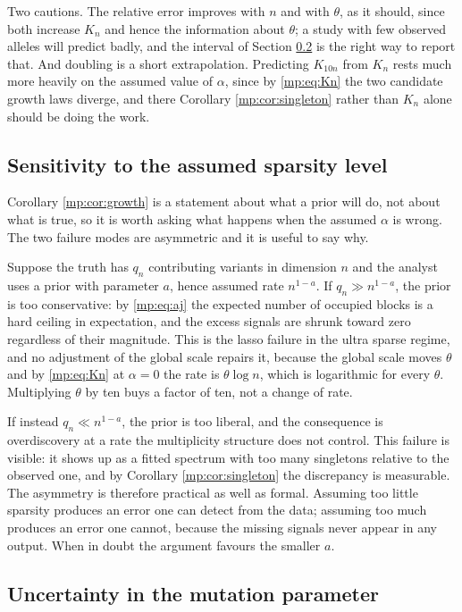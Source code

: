 Two cautions. The relative error improves with $n$ and with $\theta$, as it should, since
both increase $K_n$ and hence the information about $\theta$; a study with few observed
alleles will predict badly, and the interval of Section \ref{mp:sec:numD} is the right way to
report that. And doubling is a short extrapolation. Predicting $K_{10n}$ from $K_n$ rests
much more heavily on the assumed value of $\alpha$, since by \eqref{mp:eq:Kn} the two candidate
growth laws diverge, and there Corollary \ref{mp:cor:singleton} rather than $K_n$ alone should
be doing the work.

\subsection{Sensitivity to the assumed sparsity level}
\label{mp:sec:sens}

Corollary \ref{mp:cor:growth} is a statement about what a prior will do, not about what is true,
so it is worth asking what happens when the assumed $\alpha$ is wrong. The two failure modes
are asymmetric and it is useful to say why.

Suppose the truth has $q_n$ contributing variants in dimension $n$ and the analyst uses a
prior with parameter $a$, hence assumed rate $n^{1-a}$. If $q_n\gg n^{1-a}$, the prior is too
conservative: by \eqref{mp:eq:aj} the expected number of occupied blocks is a hard ceiling in
expectation, and the excess signals are shrunk toward zero regardless of their magnitude.
This is the lasso failure in the ultra sparse regime, and no adjustment of the global scale
repairs it, because the global scale moves $\theta$ and by \eqref{mp:eq:Kn} at $\alpha=0$ the
rate is $\theta\log n$, which is logarithmic for every $\theta$. Multiplying $\theta$ by ten
buys a factor of ten, not a change of rate.

If instead $q_n\ll n^{1-a}$, the prior is too liberal, and the consequence is overdiscovery
at a rate the multiplicity structure does not control. This failure is visible: it shows up
as a fitted spectrum with too many singletons relative to the observed one, and by Corollary
\ref{mp:cor:singleton} the discrepancy is measurable. The asymmetry is therefore practical as
well as formal. Assuming too little sparsity produces an error one can detect from the data;
assuming too much produces an error one cannot, because the missing signals never appear in
any output. When in doubt the argument favours the smaller $a$.

\subsection{Uncertainty in the mutation parameter}
\label{mp:sec:numD}

